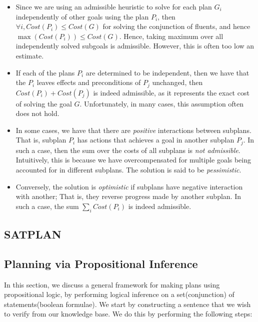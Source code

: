 \documentclass[11pt]{article}
\begin{document}
\begin{itemize}
    \item Since we are using an admissible heuristic to solve for each plan $G_i$ independently of other goals using the plan $P_i$, then $\forall i, Cost(P_i) \leq Cost(G)$ for solving the conjunction of fluents, and hence $\max(Cost(P_i)) \leq Cost(G)$. Hence, taking maximum over all independently solved subgoals is admissible. However, this is often too low an estimate.
    \item If each of the plans $P_i$ are determined to be independent, then we have that the $P_i$ leaves effects and preconditions of $P_j$ unchanged, then $Cost(P_i) + Cost(P_j)$ is indeed admissible, as it represents the exact cost of solving the goal $G$. Unfortunately, in many cases, this assumption often does not hold.
    \item In some cases, we have that there are \textit{positive} interactions between subplans. That is, subplan $P_i$ has actions that achieves a goal in another subplan $P_j$. In such a case, then the sum over the costs of all subplans is \textit{not admissible}. Intuitively, this is because we have overcompensated for multiple goals being accounted for in different subplans. The solution is said to be \textit{pessimistic}.
    \item Conversely, the solution is \textit{optimistic} if subplans have negative interaction with another; That is, they reverse progress made by another subplan. In such a case, the sum $\sum_i Cost(P_i)$ is indeed admissible.
\end{itemize}

\subsection{\textsc{SATPLAN}}

\subsection{Planning via Propositional Inference}

In this section, we discuss a general framework for making plans using propositional logic, by performing logical inference on a set(conjunction) of statements(boolean formulae). We start by constructing a sentence that we wish to verify from our knowledge base. We do this by performing the following steps:
\end{document}

